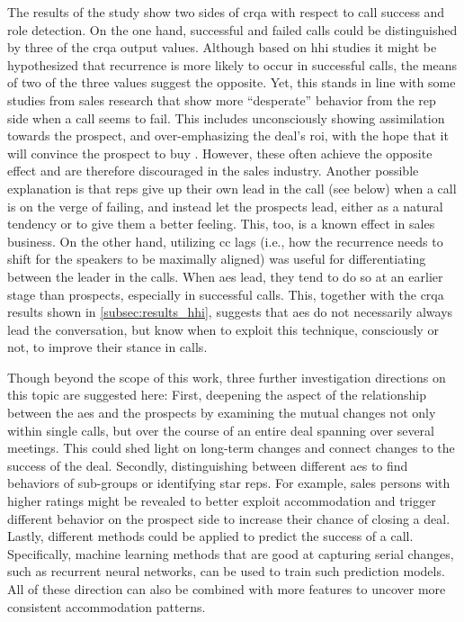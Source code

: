 The results of the study show two sides of \ac{crqa} with respect to call success and role detection.
On the one hand, successful and failed calls could be distinguished by three of the \ac{crqa} output values.
Although based on \ac{hhi} studies it might be hypothesized that recurrence is more likely to occur in successful calls, the means of two of the three values suggest the opposite.
Yet, this stands in line with some studies from sales research that show more \enquote{desperate} behavior from the rep side when a call seems to fail.
This includes unconsciously showing assimilation towards the prospect, and over-emphasizing the deal's \ac{roi}, with the hope that it will convince the prospect to buy \citep{Orlob2018roi}.
However, these often achieve the opposite effect and are therefore discouraged in the sales industry.
Another possible explanation is that reps give up their own lead in the call (see below) when a call is on the verge of failing, and instead let the prospects lead, either as a natural tendency or to give them a better feeling.
This, too, is a known effect in sales business.
On the other hand, utilizing \acl{cc} lags (i.e., how the recurrence needs to shift for the speakers to be maximally aligned) was useful for differentiating between the leader in the calls.
When \acp{ae} lead, they tend to do so at an earlier stage than prospects, especially in successful calls.
This, together with the \ac{crqa} results shown in \cref{subsec:results_hhi}, suggests that \acp{ae} do not necessarily always lead the conversation, but know when to exploit this technique, consciously or not, to improve their stance in calls.

Though beyond the scope of this work, three further investigation directions on this topic are suggested here:
First, deepening the aspect of the relationship between the \acp{ae} and the prospects by examining the mutual changes not only within single calls, but over the course of an entire deal spanning over several meetings.
This could shed light on long-term changes and connect changes to the success of the deal.
Secondly, distinguishing between different \acp{ae} to find behaviors of sub-groups or identifying star reps.
For example, sales persons with higher ratings might be revealed to better exploit accommodation and trigger different behavior on the prospect side to increase their chance of closing a deal.
Lastly, different methods could be applied to predict the success of a call.
Specifically, machine learning methods that are good at capturing serial changes, such as recurrent neural networks, can be used to train such prediction models.
All of these direction can also be combined with more features to uncover more consistent accommodation patterns.

